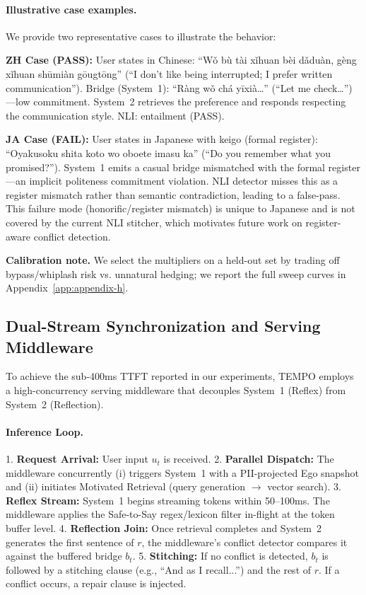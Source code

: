 \documentclass[11pt]{article}
\begin{document}
\paragraph{Illustrative case examples.}
We provide two representative cases to illustrate the behavior:

\noindent\textbf{ZH Case (PASS):} User states in Chinese: ``W\v{o} b\`{u} t\`{a}i x\v{i}huan b\`{e}i d\v{a}du\`{a}n, g\`{e}ng x\v{i}huan sh\={u}mi\`{a}n g\={o}ugt\={o}ng'' (``I don't like being interrupted; I prefer written communication''). Bridge (System~1): ``R\`{a}ng w\v{o} ch\'{a} y\={i}xi\`{a}\ldots'' (``Let me check\ldots'')---low commitment. System~2 retrieves the preference and responds respecting the communication style. NLI: entailment (PASS).

\noindent\textbf{JA Case (FAIL):} User states in Japanese with keigo (formal register): ``Oyakusoku shita koto wo oboete imasu ka'' (``Do you remember what you promised?''). System~1 emits a casual bridge mismatched with the formal register---an implicit politeness commitment violation. NLI detector misses this as a register mismatch rather than semantic contradiction, leading to a false-pass. This failure mode (honorific/register mismatch) is unique to Japanese and is not covered by the current NLI stitcher, which motivates future work on register-aware conflict detection.

\noindent\textbf{Calibration note.} We select the multipliers on a held-out set by trading off bypass/whiplash risk vs. unnatural hedging; we report the full sweep curves in Appendix~\ref{app:appendix-h}.

\subsection{Dual-Stream Synchronization and Serving Middleware}
\label{app:serving-middleware}
To achieve the sub-400ms TTFT reported in our experiments, TEMPO employs a high-concurrency serving middleware that decouples System~1 (Reflex) from System~2 (Reflection). 

\paragraph{Inference Loop.} 
1. \textbf{Request Arrival:} User input $u_t$ is received.
2. \textbf{Parallel Dispatch:} The middleware concurrently (i) triggers System~1 with a PII-projected Ego snapshot and (ii) initiates Motivated Retrieval (query generation $\rightarrow$ vector search).
3. \textbf{Reflex Stream:} System~1 begins streaming tokens within 50--100ms. The middleware applies the Safe-to-Say regex/lexicon filter in-flight at the token buffer level.
4. \textbf{Reflection Join:} Once retrieval completes and System~2 generates the first sentence of $r$, the middleware's conflict detector compares it against the buffered bridge $b_t$.
5. \textbf{Stitching:} If no conflict is detected, $b_t$ is followed by a stitching clause (e.g., ``And as I recall...'') and the rest of $r$. If a conflict occurs, a repair clause is injected.
\end{document}
